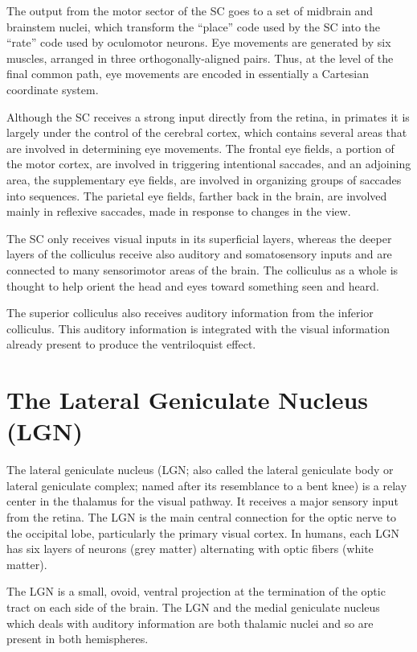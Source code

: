 \documentclass[]{book}
\begin{document}
The output from the motor sector of the SC goes to a set of midbrain and brainstem nuclei, which transform the ``place'' code used by the SC into the ``rate'' code used by oculomotor neurons. Eye movements are generated by six muscles, arranged in three orthogonally-aligned pairs. Thus, at the level of the final common path, eye movements are encoded in essentially a Cartesian coordinate system.

Although the SC receives a strong input directly from the retina, in primates it is largely under the control of the cerebral cortex, which contains several areas that are involved in determining eye movements. The frontal eye fields, a portion of the motor cortex, are involved in triggering intentional saccades, and an adjoining area, the supplementary eye fields, are involved in organizing groups of saccades into sequences. The parietal eye fields, farther back in the brain, are involved mainly in reflexive saccades, made in response to changes in the view.

The SC only receives visual inputs in its superficial layers, whereas the deeper layers of the colliculus receive also auditory and somatosensory inputs and are connected to many sensorimotor areas of the brain. The colliculus as a whole is thought to help orient the head and eyes toward something seen and heard.

The superior colliculus also receives auditory information from the inferior colliculus. This auditory information is integrated with the visual information already present to produce the ventriloquist effect.

\hypertarget{the-lateral-geniculate-nucleus-lgn}{%
\section{The Lateral Geniculate Nucleus (LGN)}\label{the-lateral-geniculate-nucleus-lgn}}

The lateral geniculate nucleus (LGN; also called the lateral geniculate body or lateral geniculate complex; named after its resemblance to a bent knee) is a relay center in the thalamus for the visual pathway. It receives a major sensory input from the retina. The LGN is the main central connection for the optic nerve to the occipital lobe, particularly the primary visual cortex. In humans, each LGN has six layers of neurons (grey matter) alternating with optic fibers (white matter).

The LGN is a small, ovoid, ventral projection at the termination of the optic tract on each side of the brain. The LGN and the medial geniculate nucleus which deals with auditory information are both thalamic nuclei and so are present in both hemispheres.
\end{document}
